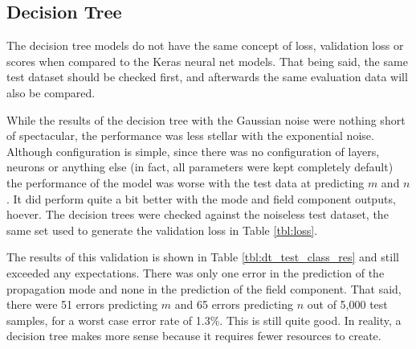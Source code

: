 \documentclass[conference]{IEEEtran}
\begin{document}
\subsection{Decision Tree}

The decision tree models do not have the same concept of loss, validation loss or scores when compared to the Keras neural net models.
That being said, the same test dataset should be checked first, and afterwards the same evaluation data will also be compared. 

While the results of the decision tree with the Gaussian noise were nothing short of spectacular, the performance was less stellar with the exponential noise. 
Although configuration is simple, since there was no configuration of layers, neurons or anything else (in fact, all parameters were kept completely default) the performance of the model was worse with the test data at predicting $m$ and $n$. 
It did perform quite a bit better with the mode and field component outputs, hoever.
The decision trees were checked against the noiseless test dataset, the same set used to generate the validation loss in Table \ref{tbl:loss}.

\begin{table}
	\centering
	\caption{Classification Errors in Decision Tree Algorithm from 5000-Sample Test Dataset.}
	\setlength\extrarowheight{2pt}
	\label{tbl:dt_test_class_res}
\end{table}

The results of this validation is shown in Table \ref{tbl:dt_test_class_res} and still exceeded any expectations. 
There was only one error in the prediction of the propagation mode and none in the prediction of the field component. That said, there were 51 errors predicting $m$ and 65 errors predicting $n$ out of 5,000 test samples, for a worst case error rate of 1.3\%. 
This is still quite good. In reality, a decision tree makes more sense because it requires fewer resources to create.
\end{document}
